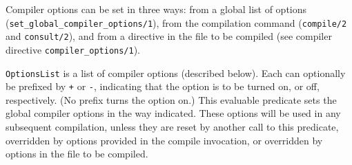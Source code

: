 Compiler options can be set in three ways: from a global list of
options ({\tt set\_global\_compiler\_options/1}), from the
compilation command ({\tt compile/2} and {\tt consult/2}), and
from a directive in the file to be compiled (see compiler directive
{\tt compiler\_options/1}).

\begin{description}
    {\tt OptionsList} is a list of compiler options (described below).
    Each can optionally be prefixed by \verb|+| or \verb|-|,
    indicating that the option is to be turned on, or off,
    respectively.  (No prefix turns the option on.)  This evaluable
    predicate sets the global compiler options in the way indicated.
    These options will be used in any subsequent compilation, unless
    they are 
    reset by another call to this predicate, overridden by options
    provided in the compile invocation, or overridden by options in
    the file to be compiled.
\end{description}

